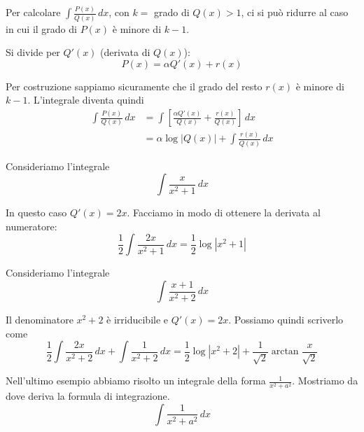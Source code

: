 \begin{remark}
Per calcolare $\int \frac{P(x)}{Q(x)} \, dx$, con $k = $ grado di $Q(x) > 1$, ci si può ridurre al caso in cui il grado di $P(x)$ è minore di $k-1$.

Si divide per $Q'(x)$ (derivata di $Q(x)$):
\begin{equation*}
P(x) = \alpha Q'(x) + r(x)
\end{equation*}

Per costruzione sappiamo sicuramente che il grado del resto $r(x)$ è minore di $k-1$. L'integrale diventa quindi
\begin{align*}
\int \frac{P(x)}{Q(x)} \, dx &= \int \left[\frac{\alpha Q'(x)}{Q(x)} + \frac{r(x)}{Q(x)} \right] \, dx \\
&= \alpha \log |Q(x)| + \int \frac{r(x)}{Q(x)} \, dx
\end{align*}
\end{remark}

\begin{example}
Consideriamo l'integrale
\begin{equation*}
\int \frac{x}{x^2+1} \, dx
\end{equation*}

In questo caso $Q'(x) = 2x$. Facciamo in modo di ottenere la derivata al numeratore:
\begin{equation*}
\frac{1}{2} \int \frac{2x}{x^2+1} \, dx = \frac{1}{2} \log |x^2+1|
\end{equation*}
\end{example}

\begin{example}
Consideriamo l'integrale
\begin{equation*}
\int \frac{x+1}{x^2+2} \, dx
\end{equation*}

Il denominatore $x^2+2$ è irriducibile e $Q'(x) = 2x$. Possiamo quindi scriverlo come
\begin{equation*}
\frac{1}{2} \int \frac{2x}{x^2+2} \, dx + \int \frac{1}{x^2+2} \, dx = \frac{1}{2} \log |x^2+2| + \frac{1}{\sqrt{2}} \arctan \frac{x}{\sqrt{2}}
\end{equation*}
\end{example}

Nell'ultimo esempio abbiamo risolto un integrale della forma $\frac{1}{x^2+a^2}$. Mostriamo da dove deriva la formula di integrazione.
\begin{equation*}
\int \frac{1}{x^2+a^2} \, dx
\end{equation*}


